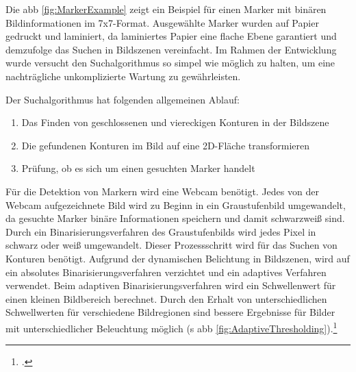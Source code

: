 \noindent Die \acs{abb} \ref{fig:MarkerExample} zeigt ein Beispiel für einen Marker mit binären Bildinformationen im 7x7-Format. Ausgewählte Marker wurden auf Papier gedruckt und laminiert, da laminiertes Papier eine flache Ebene garantiert und demzufolge das Suchen in Bildszenen vereinfacht. Im Rahmen der Entwicklung wurde versucht den Suchalgorithmus so simpel wie möglich zu halten, um eine nachträgliche unkomplizierte Wartung zu gewährleisten.

\newpage

Der Suchalgorithmus hat folgenden allgemeinen Ablauf:

\begin{enumerate}
\item Das Finden von geschlossenen und viereckigen Konturen in der Bildszene
\item Die gefundenen Konturen im Bild auf eine 2D-Fläche transformieren
\item Prüfung, ob es sich um einen gesuchten Marker handelt
\end{enumerate}

\noindent Für die Detektion von Markern wird eine Webcam benötigt. Jedes von der Webcam aufgezeichnete Bild wird zu Beginn in ein Graustufenbild umgewandelt, da gesuchte Marker binäre Informationen speichern und damit schwarzweiß sind. Durch ein Binarisierungsverfahren des Graustufenbilds wird jedes Pixel in schwarz oder weiß umgewandelt. Dieser Prozessschritt wird für das Suchen von Konturen benötigt. Aufgrund der dynamischen Belichtung in Bildszenen, wird auf ein absolutes Binarisierungsverfahren verzichtet und ein adaptives Verfahren verwendet. Beim adaptiven Binarisierungsverfahren wird ein Schwellenwert für einen kleinen Bildbereich berechnet. Durch den Erhalt von unterschiedlichen Schwellwerten für verschiedene Bildregionen sind bessere Ergebnisse für Bilder mit unterschiedlicher Beleuchtung möglich (\acs{s} \acs{abb} \ref{fig:AdaptiveThresholding}).\footcite{AdaptiveThresholdingDescription}

